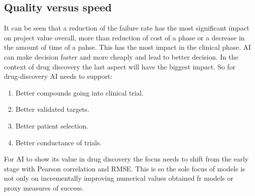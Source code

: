 	\subsection{Quality versus speed}
	It can be seen that a reduction of the failure rate has the most significant impact on project value overall, more than reduction of cost of a phase or a decrease in the amount of time of a pahse.
	This has the most impact in the clinical phase.
	AI can make decision faster and more cheaply and lead to better decision.
	In the context of drug discovery the last aspect will have the biggest impact.
	So for drug-discovery AI needs to support:

	\begin{multicols}{2}
		\begin{enumerate}
			\item Better compounds going into clinical trial.
			\item Better validated targets.
			\item Better patient selection.
			\item Better conductance of trials.
		\end{enumerate}
	\end{multicols}

	For AI to show its value in drug discovery the focus needs to shift from the early stage with Pearson correlation and RMSE.
	This is so the sole focus of models is not only on incrementally improving numerical values obtained fr models or proxy measures of success.

